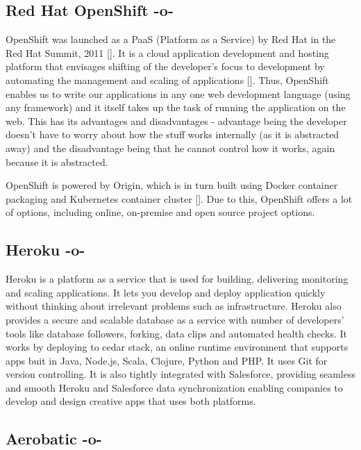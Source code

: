 \subsection{Red Hat OpenShift -o-}

OpenShift was launched as a PaaS (Platform as a Service) by Red Hat in
the Red Hat Summit, 2011 [\cite{www-paas-openshift}].  It is a cloud
application development and hosting platform that envisages shifting
of the developer's focus to development by automating the management
and scaling of applications [\cite{www-developers-openshift}].  Thus,
OpenShift enables us to write our applications in any one web
development language (using any framework) and it itself takes up the
task of running the application on the web\cite{www-openshift}.  This
has its advantages and disadvantages - advantage being the developer
doesn't have to worry about how the stuff works internally (as it is
abstracted away) and the disadvantage being that he cannot control how
it works, again because it is abstracted.

OpenShift is powered by Origin, which is in turn built using Docker
container packaging and Kubernetes container
cluster [\cite{www-openshift-blog}].  Due to this, OpenShift offers a
lot of options, including online, on-premise and open source project
options.


    
\subsection{Heroku -o-}

Heroku is a platform as a service that is used for building,
delivering monitoring and scaling applications\cite{www-Heroku}. It
lets you develop and deploy application quickly without thinking about
irrelevant problems such as infrastructure. Heroku also provides a
secure and scalable database as a service with number of developers'
tools like database followers, forking, data clips and automated
health checks. It works by deploying to cedar stack, an online runtime
environment that supports apps buit in Java, Node.js, Scala, Clojure,
Python and PHP\cite{www-cedar}. It uses Git for version
controlling. It is also tightly integrated with Salesforce, providing
seamless and smooth Heroku and Salesforce data synchronization
enabling companies to develop and design creative apps that uses both
platforms.



\subsection{Aerobatic -o-}

